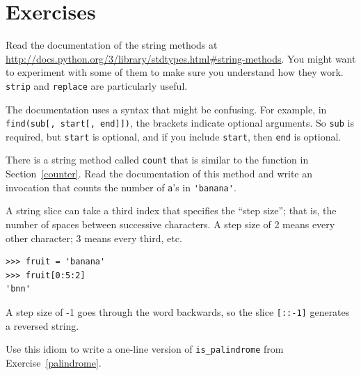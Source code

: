 \documentclass[10pt]{book}
\begin{document}
\section{Exercises}

\begin{exercise}

Read the documentation of the string methods at
\url{http://docs.python.org/3/library/stdtypes.html#string-methods}.
You might want to experiment with some of them to make sure you
understand how they work.  {\tt strip} and {\tt replace} are
particularly useful.

The documentation uses a syntax that might be confusing.
For example, in \verb"find(sub[, start[, end]])", the brackets
indicate optional arguments.  So {\tt sub} is required, but
{\tt start} is optional, and if you include {\tt start},
then {\tt end} is optional.

\end{exercise}


\begin{exercise}

There is a string method called {\tt count} that is similar
to the function in Section~\ref{counter}.  Read the documentation
of this method
and write an invocation that counts the number of {\tt a}'s
in \verb"'banana'".
\end{exercise}


\begin{exercise}

A string slice can take a third index that specifies the ``step
size''; that is, the number of spaces between successive characters.
A step size of 2 means every other character; 3 means every third,
etc.

\begin{verbatim}
>>> fruit = 'banana'
>>> fruit[0:5:2]
'bnn'
\end{verbatim}

A step size of -1 goes through the word backwards, so
the slice \verb"[::-1]" generates a reversed string.

Use this idiom to write a one-line version of \verb"is_palindrome"
from Exercise~\ref{palindrome}.
\end{exercise}
\end{document}
